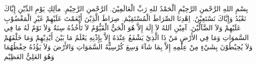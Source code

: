 \documentclass{article}
\begin{document}
  بِسْمِ اللهِ الرَّحْمنِ الرَّحِيْمِ اَلْحَمْدُ للهِ رَبِّ الْعَالَمِيْنَ. اَلرَّحْمنِ الرَّحِيْمِ. ماَلِكِ يَوْمِ الدِّيْنِ إِيِّاكَ نَعْبُدُ وَإِيَّاكَ نَسْتَعِيْنُ. اِهْدِنَا الصِّرَاطَ الْمُسْتَقِيْمَ. صِرَاطَ الَّذِيْنَ أَنْعَمْتَ عَلَيْهِمْ غَيْرِ الْمَغْضُوْبِ عَلَيْهِمْ وَلاَ الضَّآلِّيْنَ. آمِيْنِ
  اَللهُ لاَ إِلَهَ إِلاَّ هُوَ الْحَيُّ الْقَيُّوْمُ لاَ تَأْخُذُهُ سِنَةٌ وَلاَ نَوْمٌ لَهُ مَا فِي السَّموَاتِ وَمَا فِي الأَرْضِ مَنْ ذَا الَّذِيْ يَشْفَعُ عِنْدَهُ إِلاَّ بِإِذْنِهِ يَعْلَمُ مَا بَيْنَ أَيْدِيْهِمْ وَمَا خَلْفَهُمْ وَلاَ يُحِيْطُوْنَ بِشَيْءٍ مِنْ عِلْمِهِ إِلاَّ بِمَا شَآءَ وَسِعَ كُرْسِيُّهُ السَّمَوَاتِ وَالأَرْضَ  وَلاَ يَؤُدُهُ حِفْظُهُمَا وَهُوَ العَلِيُّ العَظِيْم
\clearpage
\end{document}
